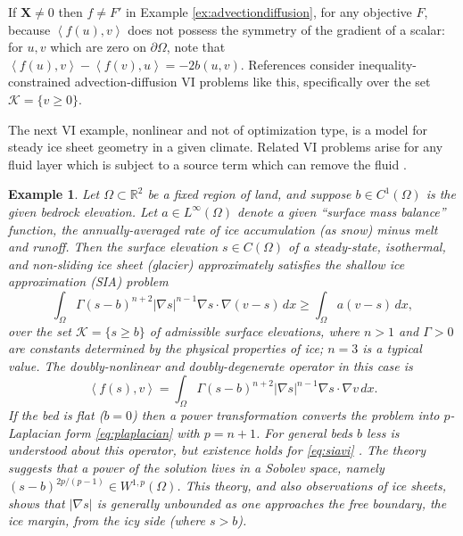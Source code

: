 \documentclass[letterpaper,final,12pt,reqno]{amsart}
\theoremstyle{cstyle}
\theoremstyle{cstyle*}
\theoremstyle{dstyle}
\newtheorem{example}[theorem]{Example}
\numberwithin{equation}{section}
\numberwithin{figure}{section}
\numberwithin{table}{section}
\numberwithin{theorem}{section}
\newcommand{\RR}{\mathbb{R}}
\newcommand{\grad}{\nabla}
\newcommand{\bX}{\mathbf{X}}
\newcommand{\cK}{\mathcal{K}}
\newcommand{\ip}[2]{\left<#1,#2\right>}
\begin{document}
If $\bX \ne 0$ then $f\ne F'$ in Example \ref{ex:advectiondiffusion}, for any objective $F$, because $\ip{f(u)}{v}$ does not possess the symmetry of the gradient of a scalar: for $u,v$ which are zero on $\partial \Omega$, note that $\ip{f(u)}{v} - \ip{f(v)}{u} = -2 b(u,v)$.  References \cite{Bueler2021conservation,ChangNakshatrala2017} consider inequality-constrained advection-diffusion VI problems like this, specifically over the set $\cK = \{v\ge 0\}$.

The next VI example, nonlinear and not of optimization type, is a model for steady ice sheet geometry in a given climate.  Related VI problems arise for any fluid layer which is subject to a source term which can remove the fluid \cite{Bueler2021conservation}.

\begin{example}  \label{ex:sia}  Let $\Omega \subset \RR^2$ be a fixed region of land, and suppose $b \in C^1(\Omega)$ is the given bedrock elevation.  Let $a \in L^\infty(\Omega)$ denote a given ``surface mass balance'' function, the annually-averaged rate of ice accumulation (as snow) minus melt and runoff.  Then the surface elevation $s\in C(\Omega)$ of a steady-state, isothermal, and non-sliding ice sheet (glacier) approximately satisfies the \emph{shallow ice approximation} (SIA) \cite{GreveBlatter2009} problem
\begin{equation}
\int_\Omega \Gamma (s-b)^{n+2} |\grad s|^{n-1} \grad s \cdot \grad (v-s) \,dx \ge \int_\Omega a (v-s)\,dx, \label{eq:siavi}
\end{equation}
over the set $\mathcal{K} = \{s\ge b\}$ of admissible surface elevations, where $n>1$ and $\Gamma>0$ are constants determined by the physical properties of ice; $n=3$ is a typical value.  The doubly-nonlinear and doubly-degenerate operator in this case is
\begin{equation}
\ip{f(s)}{v} = \int_\Omega \Gamma (s-b)^{n+2} |\grad s|^{n-1} \grad s \cdot \grad v\,dx. \label{eq:sia}
\end{equation}
If the bed is flat ($b=0$) then a power transformation converts the problem into $p$-Laplacian form \eqref{eq:plaplacian} with $p=n+1$.  For general beds $b$ less is understood about this operator, but existence holds for \eqref{eq:siavi} \cite{JouvetBueler2012}.  The theory suggests that a power of the solution lives in a Sobolev space, namely $(s-b)^{2p/(p-1)} \in W^{1,p}(\Omega)$.  This theory, and also observations of ice sheets, shows that $|\grad s|$ is generally unbounded as one approaches the free boundary, the \emph{ice margin}, from the icy side (where $s>b$).
\end{example}
\end{document}
